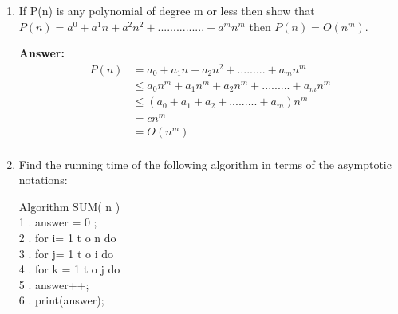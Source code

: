 \documentclass[a4paper]{article}
\begin{document}
\begin{enumerate}[label=(\alph*)]
     \textbf{Answer:}
     
     \begin{align*}
         T(x) &= a_0 + a_1x + a_2x^2 +. . . . . . . . . + a_m x^m \\
         &\le a_0x^m + a_1x^m + a_2x^m +. . . . . . . . . + a_m x^m \\
         &\le (a_0 + a_1 + a_2 +. . . . . . . . . + a_m) x^m \\
         &= c x^m \\
         &= O(x^m) \\
         \\
         T(x) &= a_0 + a_1x + a_2x^2 +. . . . . . . . . + a_m x^m \\
         &\ge a_m x^m \\
         &= c n^m \\
         &= \Omega(n^m) \
     \end{align*}
     
     \begin{changemargin}{0.8cm}{0cm}
         So, we can say that $ \Theta(x^m) $
     \end{changemargin}
     
     \vspace{0.5cm}
     \item If P(n) is any polynomial of degree m or less then show that {$P(n) = a^0 + a^1n + a^2n^2 +. . . . . . . . . . . . . . . + a^m n^m$} then {$P(n) = O(n^m)$}.
     
     \textbf{Answer:}
     \begin{align*}
         P(n) &= a_0 + a_1n + a_2n^2 +. . . . . . . . . + a_m n^m \\
         &\le a_0n^m + a_1n^m + a_2n^m +. . . . . . . . . + a_m n^m \\
         &\le (a_0 + a_1 + a_2 +. . . . . . . . . + a_m) n^m \\
         &= c n^m \\
         &= O(n^m) \\
     \end{align*}
     
     \vspace{0.5cm}
     \item Find the running time of the following algorithm in terms of the asymptotic notations:

     \*Algorithm SUM( n )
     \\1 . \quad answer = 0 ;
     \\2 . \quad for i= 1 t o n do
     \\3 . \quad \quad for j= 1 t o i do
     \\4 . \quad \quad \quad for k = 1 t o j do
     \\5 . \quad \quad \quad \quad answer++;
     \\6 . \quad print(answer);
     

\end{enumerate}
\end{document}
